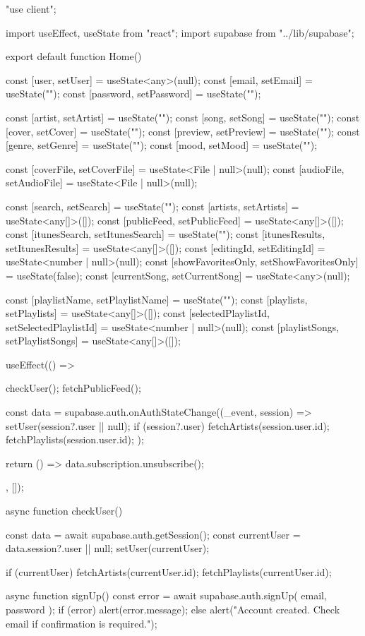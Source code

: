 "use client";

import { useEffect, useState } from "react";
import { supabase } from "../lib/supabase";

export default function Home() {
  const [user, setUser] = useState<any>(null);
  const [email, setEmail] = useState("");
  const [password, setPassword] = useState("");

  const [artist, setArtist] = useState("");
  const [song, setSong] = useState("");
  const [cover, setCover] = useState("");
  const [preview, setPreview] = useState("");
  const [genre, setGenre] = useState("");
  const [mood, setMood] = useState("");

  const [coverFile, setCoverFile] = useState<File | null>(null);
  const [audioFile, setAudioFile] = useState<File | null>(null);

  const [search, setSearch] = useState("");
  const [artists, setArtists] = useState<any[]>([]);
  const [publicFeed, setPublicFeed] = useState<any[]>([]);
  const [itunesSearch, setItunesSearch] = useState("");
  const [itunesResults, setItunesResults] = useState<any[]>([]);
  const [editingId, setEditingId] = useState<number | null>(null);
  const [showFavoritesOnly, setShowFavoritesOnly] = useState(false);
  const [currentSong, setCurrentSong] = useState<any>(null);

  const [playlistName, setPlaylistName] = useState("");
  const [playlists, setPlaylists] = useState<any[]>([]);
  const [selectedPlaylistId, setSelectedPlaylistId] = useState<number | null>(null);
  const [playlistSongs, setPlaylistSongs] = useState<any[]>([]);

  useEffect(() => {
    checkUser();
    fetchPublicFeed();

    const { data } = supabase.auth.onAuthStateChange((_event, session) => {
      setUser(session?.user || null);
      if (session?.user) {
        fetchArtists(session.user.id);
        fetchPlaylists(session.user.id);
      }
    });

    return () => data.subscription.unsubscribe();
  }, []);

  async function checkUser() {
    const { data } = await supabase.auth.getSession();
    const currentUser = data.session?.user || null;
    setUser(currentUser);

    if (currentUser) {
      fetchArtists(currentUser.id);
      fetchPlaylists(currentUser.id);
    }
  }

  async function signUp() {
    const { error } = await supabase.auth.signUp({ email, password });
    if (error) alert(error.message);
    else alert("Account created. Check email if confirmation is required.");
  }

}
